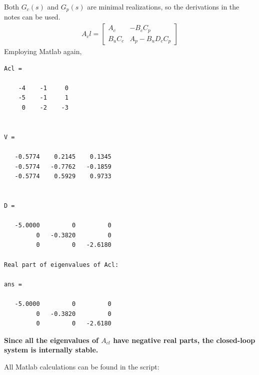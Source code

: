 Both $G_c(s)$ and $G_p(s)$ are minimal realizations, so the derivations in the notes can be used.
\begin{align*}
    A_cl = \begin{bmatrix}
        A_c & -B_c C_p \\
        B_u C_c & A_p - B_u D_c C_p
    \end{bmatrix} 
\end{align*}
Employing Matlab again,
\begin{verbatim}
Acl =

    -4    -1     0
    -5    -1     1
     0    -2    -3


V =

   -0.5774    0.2145    0.1345
   -0.5774   -0.7762   -0.1859
   -0.5774    0.5929    0.9733


D =

   -5.0000         0         0
         0   -0.3820         0
         0         0   -2.6180

Real part of eigenvalues of Acl: 

ans =

   -5.0000         0         0
         0   -0.3820         0
         0         0   -2.6180
\end{verbatim}

\textbf{Since all the eigenvalues of $A_{cl}$ have negative real parts, the closed-loop system is internally stable.}

All Matlab calculations can be found in the script:

